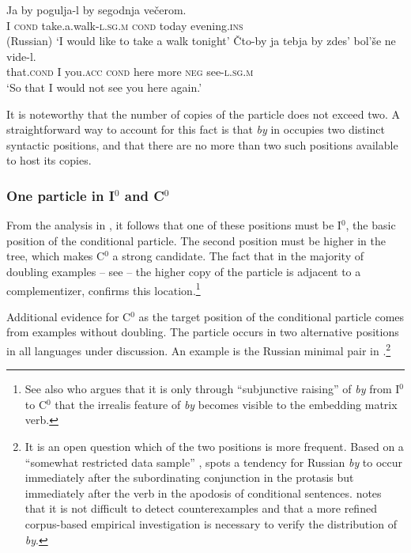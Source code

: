 \documentclass[output=paper]{langscibook}
\begin{document}
\ea
\ea\gll Ja by pogulja-l by segodnja večerom. \\
I \textsc{cond} take.a.walk-\textsc{l.sg.m} \textsc{cond} today evening.\textsc{ins} \\ \hfill (Russian)
\glt `I would like to take a walk tonight' \label{pitsch:ex:doubling_Russian_rep_a}
\ex\gll Čto-by ja tebja by zdes' bol'še ne vide-l. \\
that.\textsc{cond} I you.\textsc{acc} \textsc{cond} here more \textsc{neg} see-\textsc{l.sg.m} \\
\glt `So that I would not see you here again.' \label{pitsch:ex:doubling_Russian_rep_b}
\z
\label{pitsch:ex:doubling_Russian_rep}
\z

\noindent It is noteworthy that the number of copies of the particle does not exceed two. A straightforward way to account for this fact is that \textit{by} in  occupies two distinct syntactic positions, and that there are no more than two such positions available to host its copies.


\subsubsection{One particle in I$^0$ and C$^0$}\label{pitsch:sec:CRaining}

From the analysis in , it follows that one of these positions must be I$^0$, the basic position of the conditional particle. The second position must be higher in the tree, which makes C$^0$ a strong candidate. The fact that in the majority of doubling examples -- see  -- the higher copy of the particle is adjacent to a complementizer, confirms this location.\footnote{See also \citet[413]{Szucsich2009} who argues that it is only through ``subjunctive raising'' of \textit{by} from I$^0$ to C$^0$ that the irrealis feature of \textit{by} becomes visible to the embedding matrix verb.}

Additional evidence for C$^0$ as the target position of the conditional particle comes from examples without doubling. The particle occurs in two alternative positions in all languages under discussion. An example is the Russian minimal pair in .\footnote{It is an open question which of the two positions is more frequent. Based on a ``somewhat restricted data sample'' \citep[330]{Hansen2010}, \citet[60]{Hacking1998} spots a tendency for Russian \textit{by} to occur immediately after the subordinating conjunction in the protasis but immediately after the verb in the apodosis of conditional sentences. \citet{Hansen2010} notes that it is not difficult to detect counterexamples and that a more refined corpus-based empirical investigation is necessary to verify the distribution of \textit{by}.}
\end{document}
